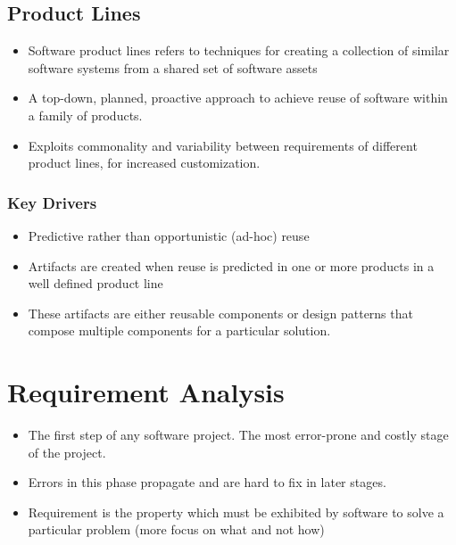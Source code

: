 \documentclass{article}
\begin{document}
\subsection{Product Lines}
\begin{itemize}
    \item Software product lines refers to techniques for creating a collection of similar software systems from a shared set of software assets
    
    \item A top-down, planned, proactive approach to achieve reuse of software within a family of products. 
    
    \item Exploits commonality and variability between requirements of different product lines, for increased customization.
\end{itemize}
\subsubsection{Key Drivers}
\begin{itemize}
    \item Predictive rather than opportunistic (ad-hoc) reuse
    
    \item Artifacts are created when reuse is predicted in one or more products in a well defined product line
    
    \item These artifacts are either reusable components or design patterns that compose multiple components for a particular solution.
\end{itemize}

\section{Requirement Analysis}
\begin{itemize}
    \item The first step of any software project. The most error-prone and costly stage of the project. 
    
    \item Errors in this phase propagate and are hard to fix in later stages. 
    
    \item Requirement is the property which must be exhibited by software to solve a particular problem (more focus on what and not how)
\end{itemize}
\end{document}
